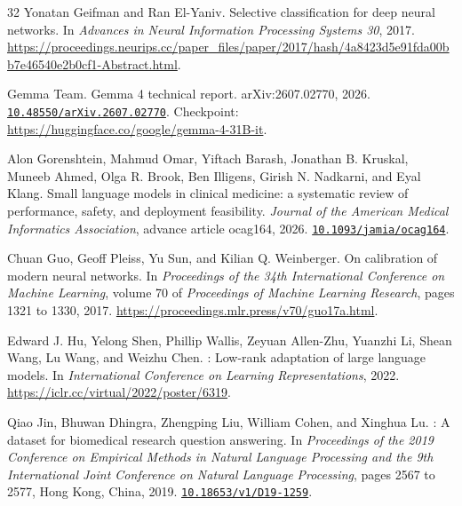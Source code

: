 \documentclass[11pt,letterpaper]{article}
\newcommand{\doi}[1]{\href{https://doi.org/#1}{\nolinkurl{#1}}}
\begin{document}
\begin{thebibliography}{32}
Yonatan Geifman and Ran El-Yaniv.
\newblock Selective classification for deep neural networks.
\newblock In \emph{Advances in Neural Information Processing Systems 30}, 2017.
\newblock \url{https://proceedings.neurips.cc/paper_files/paper/2017/hash/4a8423d5e91fda00bb7e46540e2b0cf1-Abstract.html}.

Gemma Team.
\newblock Gemma 4 technical report.
\newblock arXiv:2607.02770, 2026.
\newblock \doi{10.48550/arXiv.2607.02770}. Checkpoint: \url{https://huggingface.co/google/gemma-4-31B-it}.

Alon Gorenshtein, Mahmud Omar, Yiftach Barash, Jonathan B. Kruskal, Muneeb Ahmed, Olga R. Brook, Ben Illigens, Girish N. Nadkarni, and Eyal Klang.
\newblock Small language models in clinical medicine: a systematic review of performance, safety, and deployment feasibility.
\newblock \emph{Journal of the American Medical Informatics Association}, advance article ocag164, 2026.
\newblock \doi{10.1093/jamia/ocag164}.

Chuan Guo, Geoff Pleiss, Yu Sun, and Kilian Q. Weinberger.
\newblock On calibration of modern neural networks.
\newblock In \emph{Proceedings of the 34th International Conference on Machine Learning}, volume 70 of \emph{Proceedings of Machine Learning Research}, pages 1321 to 1330, 2017.
\newblock \url{https://proceedings.mlr.press/v70/guo17a.html}.

Edward J. Hu, Yelong Shen, Phillip Wallis, Zeyuan Allen-Zhu, Yuanzhi Li, Shean Wang, Lu Wang, and Weizhu Chen.
: Low-rank adaptation of large language models.
\newblock In \emph{International Conference on Learning Representations}, 2022.
\newblock \url{https://iclr.cc/virtual/2022/poster/6319}.

Qiao Jin, Bhuwan Dhingra, Zhengping Liu, William Cohen, and Xinghua Lu.
: A dataset for biomedical research question answering.
\newblock In \emph{Proceedings of the 2019 Conference on Empirical Methods in Natural Language Processing and the 9th International Joint Conference on Natural Language Processing}, pages 2567 to 2577, Hong Kong, China, 2019.
\newblock \doi{10.18653/v1/D19-1259}.


\end{thebibliography}
\end{document}
